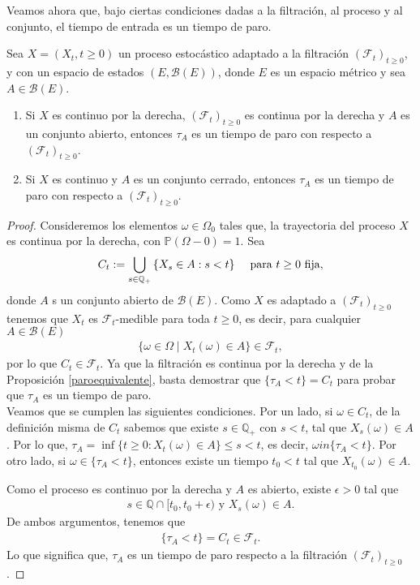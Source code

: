 Veamos ahora que, bajo ciertas condiciones dadas a la filtración, al proceso y al conjunto, el tiempo de entrada es un tiempo de paro.
\begin{proposition}
	Sea $X = (X_t, t \geq 0)$ un proceso estocástico adaptado a la filtración $(\mathcal{F}_t)_{t \geq 0}$, y con un espacio de estados $(E, \mathcal{B}(E))$, donde $E$ es un espacio métrico y sea $A \in\mathcal{B}(E)$.
	\begin{enumerate}
		\item Si $X$ es continuo por la derecha, $(\mathcal{F}_t)_{t \geq 0}$ es continua por la derecha y $A$ es un conjunto abierto, entonces $\tau_A$ es un tiempo de paro con respecto a $(\mathcal{F}_t)_{t \geq 0}$.
		\item Si $X$ es continuo y $A$ es un conjunto cerrado, entonces $\tau_A$ es un tiempo de paro con respecto a $(\mathcal{F}_t)_{t \geq 0}$.
	\end{enumerate}
\end{proposition}
\begin{proof}
	Consideremos los elementos $\omega \in \Omega_0$ tales que, la trayectoria del proceso $X$ es continua por la derecha, con $\mathbb{P}(\Omega-0) = 1$. Sea
	\begin{align*}
	C_t : = \bigcup_{s \in \mathbb{Q}_{+}} \left\lbrace X_s \in A : s < t \right\rbrace \hspace{0.3cm} \text{ para } t \geq 0 \text{ fija}, 
	\end{align*}
	donde $A$ s un conjunto abierto de $\mathcal{B}(E)$. Como $X$ es adaptado a $(\mathcal{F}_t)_{t \geq 0}$ tenemos que $X_t$ es $\mathcal{F}_t$-medible para toda $t \geq 0$, es decir, para cualquier $A \in \mathcal{B}(E)$
	\begin{align*}
	\{ \omega \in \Omega \mid X_t (\omega) \in A \} \in \mathcal{F}_t,
	\end{align*}
	por lo que $C_t \in \mathcal{F}_t$. Ya que la filtración es continua por la derecha y de la Proposición \ref{paroequivalente}, basta demostrar que $\{\tau_A < t\} = C_t$ para probar que $\tau_A$ es un tiempo de paro. \\
	
	Veamos que se cumplen las siguientes condiciones. Por un lado, si $\omega \in C_t$, de la definición misma de $C_t$ sabemos que existe $s \in \mathbb{Q}_{+}$ con $s < t$, tal que $X_s(\omega) \in A$. Por lo que, $\tau_A = \inf \{ t \geq 0 : X_t (\omega) \in A \} \leq s < t$, es decir, $\omega in \{\tau_A < t\}$. Por otro lado, si $\omega \in \{\tau_A < t\}$, entonces existe un tiempo $t_0 < t$ tal que $X_{t_0} (\omega) \in A$. 
	
	Como el proceso es continuo por la derecha y $A$ es abierto, existe $\epsilon > 0$ tal que
	\begin{align*}
	s \in \mathbb{Q}\cap [t_0, t_0 + \epsilon) \text{ y } X_s(\omega) \in A.
	\end{align*}
	De ambos argumentos, tenemos que 
	\begin{align*}
	\{ \tau_A < t \} = C_t \in \mathcal{F}_t.
	\end{align*}
	Lo que significa que, $\tau_A$ es un tiempo de paro respecto a la filtración $(\mathcal{F}_t)_{t \geq 0}$.
\end{proof}

